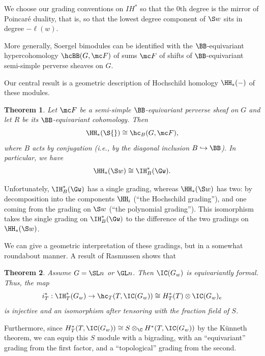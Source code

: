 \documentclass[12pt]{wart}
\newtheorem{thm}{Theorem}[section]
\theoremstyle{remark}
\begin{document}
We choose our grading conventions on $I\!H^*$ so that the 0th degree
is the mirror of Poincar\'e duality, that is, so that the lowest
degree component of $\S w$ sits in degree $-\ell(w)$.

More generally, Soergel bimodules can be identified with the
$\BB$-equivariant hypercohomology $\hcBB(G,\mc F)$ of sums $\mc F$ of
shifts of $\BB$-equivariant semi-simple perverse sheaves on
$G$.%

Our central result is a geometric description of Hochschild homology $\HH_*(-)$
of these modules.

\begin{thm}\label{sec:introduction-1}
Let $\mc F$ be a semi-simple $\BB$-equivariant perverse sheaf on $G$ and let $R$ be its $\BB$-equivariant cohomology. 
  Then %
  \begin{equation*}
    \HH_*(\S{})\cong \hc_{B}(G,\mc F),
  \end{equation*}
  where $B$ acts by conjugation (i.e., by the diagonal inclusion
  $B\hookrightarrow\BB$). In particular, we have
  \begin{equation*}
    \HH_*(\S w)\cong\IH_{B}^*(\Gw).
  \end{equation*}
\end{thm}

Unfortunately, $\IH_{B}^*(\Gw)$ has a single grading, whereas
$\HH_*(\S w)$ has two: by decomposition into the components $\HH_i$
(``the Hochschild grading''), and one coming from the grading on $\S
w$ (``the polynomial grading''). This isomorphism takes the single
grading on $\IH_B^*(\Gw)$ to the difference of the two gradings on
$\HH_*(\S w)$.

We can give a geometric interpretation of these gradings, but in a
somewhat roundabout manner.  A result of Rasmussen \cite{Ras06} shows
that

\begin{thm}\label{intro-e-f}
  Assume $G=\SL n$ or $\GL n$.  Then $\IC({G_w})$ is equivariantly formal.  Thus, the map
  \begin{equation*}
    i^*_T: \IH^*_T(G_w)\to \hc_T(T,\IC({G_w}))\cong H^*_T(T)\otimes \IC({G_w})_e
  \end{equation*}
  is injective and an isomorphism after tensoring with the fraction
  field of $S$.
\end{thm}
Furthermore, since $H^*_T(T,\IC({G_w}))\cong S\otimes_\C
H^*(T,\IC({G_w}))$ by the K\"unneth theorem, we can equip this $S$
module with a bigrading, with an ``equivariant'' grading from the
first factor, and a ``topological'' grading from the second.  
\end{document}

